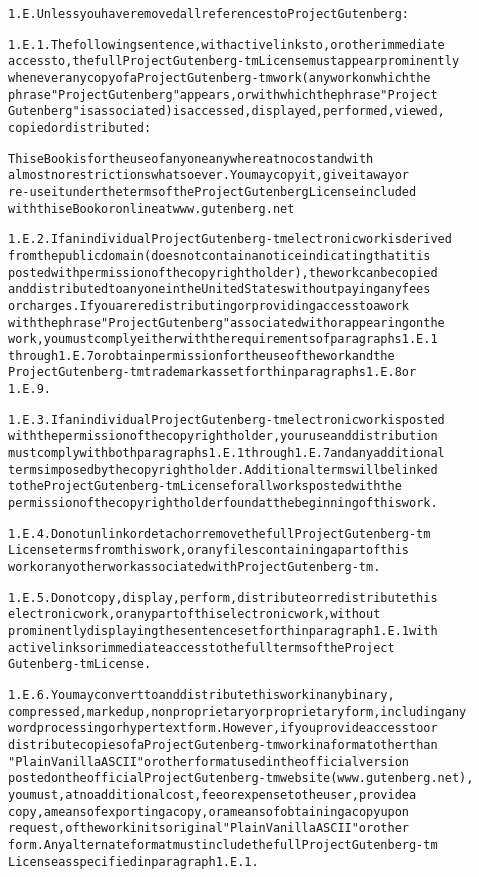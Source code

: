\documentclass[12pt]{book}[2005/09/16]
\newenvironment{PGtext}{%
\begin{alltt}
\fontsize{8.1}{9}\ttfamily\selectfont}%
{\end{alltt}}
\begin{document}
\begin{PGtext}
1.E.  Unless you have removed all references to Project Gutenberg:

1.E.1.  The following sentence, with active links to, or other immediate
access to, the full Project Gutenberg-tm License must appear prominently
whenever any copy of a Project Gutenberg-tm work (any work on which the
phrase "Project Gutenberg" appears, or with which the phrase "Project
Gutenberg" is associated) is accessed, displayed, performed, viewed,
copied or distributed:

This eBook is for the use of anyone anywhere at no cost and with
almost no restrictions whatsoever.  You may copy it, give it away or
re-use it under the terms of the Project Gutenberg License included
with this eBook or online at www.gutenberg.net

1.E.2.  If an individual Project Gutenberg-tm electronic work is derived
from the public domain (does not contain a notice indicating that it is
posted with permission of the copyright holder), the work can be copied
and distributed to anyone in the United States without paying any fees
or charges.  If you are redistributing or providing access to a work
with the phrase "Project Gutenberg" associated with or appearing on the
work, you must comply either with the requirements of paragraphs 1.E.1
through 1.E.7 or obtain permission for the use of the work and the
Project Gutenberg-tm trademark as set forth in paragraphs 1.E.8 or
1.E.9.

1.E.3.  If an individual Project Gutenberg-tm electronic work is posted
with the permission of the copyright holder, your use and distribution
must comply with both paragraphs 1.E.1 through 1.E.7 and any additional
terms imposed by the copyright holder.  Additional terms will be linked
to the Project Gutenberg-tm License for all works posted with the
permission of the copyright holder found at the beginning of this work.

1.E.4.  Do not unlink or detach or remove the full Project Gutenberg-tm
License terms from this work, or any files containing a part of this
work or any other work associated with Project Gutenberg-tm.

1.E.5.  Do not copy, display, perform, distribute or redistribute this
electronic work, or any part of this electronic work, without
prominently displaying the sentence set forth in paragraph 1.E.1 with
active links or immediate access to the full terms of the Project
Gutenberg-tm License.

1.E.6.  You may convert to and distribute this work in any binary,
compressed, marked up, nonproprietary or proprietary form, including any
word processing or hypertext form.  However, if you provide access to or
distribute copies of a Project Gutenberg-tm work in a format other than
"Plain Vanilla ASCII" or other format used in the official version
posted on the official Project Gutenberg-tm web site (www.gutenberg.net),
you must, at no additional cost, fee or expense to the user, provide a
copy, a means of exporting a copy, or a means of obtaining a copy upon
request, of the work in its original "Plain Vanilla ASCII" or other
form.  Any alternate format must include the full Project Gutenberg-tm
License as specified in paragraph 1.E.1.


\end{PGtext}
\end{document}
